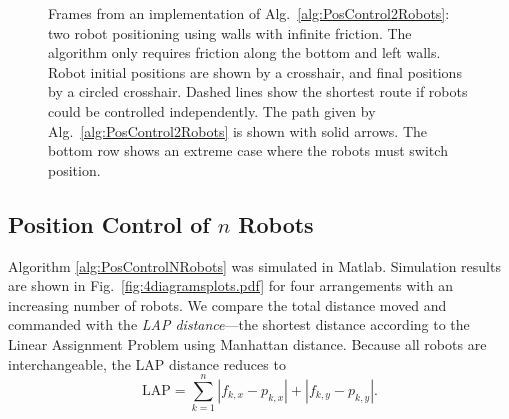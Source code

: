 \begin{figure*}
\caption{\label{fig:shapeControlMathematica1}{Frames from an implementation of Alg.\ \ref{alg:PosControl2Robots}: two robot positioning using walls with infinite friction. The algorithm only requires friction along the bottom and left walls.
Robot initial positions are shown by a crosshair, and final positions by a circled crosshair.  Dashed lines show the shortest route if robots could be controlled independently.  The path given by  Alg.\ \ref{alg:PosControl2Robots} is shown with solid arrows.
The bottom row shows an extreme case where the robots must switch position.
}
}
\end{figure*}



\subsection{Position Control of $n$ Robots}
Algorithm \ref{alg:PosControlNRobots}  was simulated in {\sc Matlab}.
Simulation results are shown in Fig.~\ref{fig:4diagramsplots.pdf} for four arrangements with an increasing number of robots.  We compare the total distance moved and commanded  with the  \emph{LAP distance}---the shortest distance according to the Linear Assignment Problem using Manhattan distance.   Because all robots are interchangeable, the LAP distance reduces to
 \[ \text{LAP} =   \sum_{k=1}^n  \left| f_{k,x}-p_{k,x} \right| +  \left|  f_{k,y}-p_{k,y}  \right| . \]


